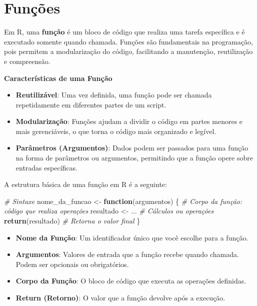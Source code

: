 \documentclass[
]{book}
\newenvironment{Shaded}{\begin{snugshade}}{\end{snugshade}}
\newcommand{\CommentTok}[1]{\textcolor[rgb]{0.56,0.35,0.01}{\textit{#1}}}
\newcommand{\ControlFlowTok}[1]{\textcolor[rgb]{0.13,0.29,0.53}{\textbf{#1}}}
\newcommand{\FunctionTok}[1]{\textcolor[rgb]{0.13,0.29,0.53}{\textbf{#1}}}
\newcommand{\NormalTok}[1]{#1}
\newcommand{\OtherTok}[1]{\textcolor[rgb]{0.56,0.35,0.01}{#1}}
\providecommand{\tightlist}{%
  \setlength{\itemsep}{0pt}\setlength{\parskip}{0pt}}
\begin{document}
\chapter{Funções}\label{funuxe7uxf5es}

Em R, uma \textbf{função} é um bloco de código que realiza uma tarefa
específica e é executado somente quando chamada. Funções são
fundamentais na programação, pois permitem a modularização do código,
facilitando a manutenção, reutilização e compreensão.

\textbf{Características de uma Função}

\begin{itemize}
\tightlist
\item
  \textbf{Reutilizável}: Uma vez definida, uma função pode ser chamada
  repetidamente em diferentes partes de um script.
\item
  \textbf{Modularização}: Funções ajudam a dividir o código em partes
  menores e mais gerenciáveis, o que torna o código mais organizado e
  legível.
\item
  \textbf{Parâmetros (Argumentos)}: Dados podem ser passados para uma
  função na forma de parâmetros ou argumentos, permitindo que a função
  opere sobre entradas específicas.
\end{itemize}

A estrutura básica de uma função em R é a seguinte:

\begin{Shaded}
\begin{Highlighting}[]
\CommentTok{\# Sintaxe}
\NormalTok{nome\_da\_funcao }\OtherTok{\textless{}{-}} \ControlFlowTok{function}\NormalTok{(argumentos) \{}
  \CommentTok{\# Corpo da função: código que realiza operações}
\NormalTok{  resultado }\OtherTok{\textless{}{-}}\NormalTok{ ... }\CommentTok{\# Cálculos ou operações}
  \FunctionTok{return}\NormalTok{(resultado) }\CommentTok{\# Retorna o valor final}
\NormalTok{\}}
\end{Highlighting}
\end{Shaded}

\begin{itemize}
\tightlist
\item
  \textbf{Nome da Função}: Um identificador único que você escolhe para a
  função.
\item
  \textbf{Argumentos}: Valores de entrada que a função recebe quando
  chamada. Podem ser opcionais ou obrigatórios.
\item
  \textbf{Corpo da Função}: O bloco de código que executa as operações
  definidas.
\item
  \textbf{Return (Retorno)}: O valor que a função devolve após a execução.
\end{itemize}
\end{document}
